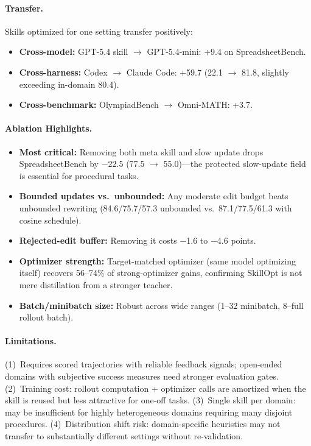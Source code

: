 \documentclass[11pt,a4paper]{article}
\begin{document}
\paragraph{Transfer.}
Skills optimized for one setting transfer positively:
\begin{itemize}[nosep]
    \item \textbf{Cross-model:} GPT-5.4 skill $\to$ GPT-5.4-mini: +9.4 on SpreadsheetBench.
    \item \textbf{Cross-harness:} Codex $\to$ Claude Code: +59.7 (22.1 $\to$ 81.8, slightly exceeding in-domain 80.4).
    \item \textbf{Cross-benchmark:} OlympiadBench $\to$ Omni-MATH: +3.7.
\end{itemize}

\paragraph{Ablation Highlights.}
\begin{itemize}[nosep]
    \item \textbf{Most critical:} Removing both meta skill and slow update drops SpreadsheetBench by $-$22.5 (77.5 $\to$ 55.0)---the protected slow-update field is essential for procedural tasks.
    \item \textbf{Bounded updates vs.\ unbounded:} Any moderate edit budget beats unbounded rewriting (84.6/75.7/57.3 unbounded vs.\ 87.1/77.5/61.3 with cosine schedule).
    \item \textbf{Rejected-edit buffer:} Removing it costs $-$1.6 to $-$4.6 points.
    \item \textbf{Optimizer strength:} Target-matched optimizer (same model optimizing itself) recovers 56--74\% of strong-optimizer gains, confirming SkillOpt is not mere distillation from a stronger teacher.
    \item \textbf{Batch/minibatch size:} Robust across wide ranges (1--32 minibatch, 8--full rollout batch).
\end{itemize}

\paragraph{Limitations.}
(1)~Requires scored trajectories with reliable feedback signals; open-ended domains with subjective success measures need stronger evaluation gates. (2)~Training cost: rollout computation + optimizer calls are amortized when the skill is reused but less attractive for one-off tasks. (3)~Single skill per domain: may be insufficient for highly heterogeneous domains requiring many disjoint procedures. (4)~Distribution shift risk: domain-specific heuristics may not transfer to substantially different settings without re-validation.
\end{document}
